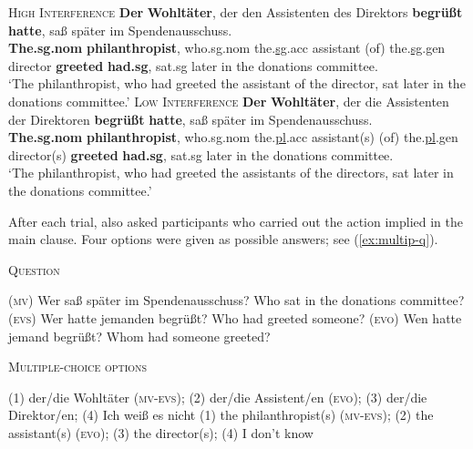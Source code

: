 \documentclass{cambridge7A}\usepackage[]{graphicx}\usepackage[]{color}
\begin{document}
\begin{exe}
    \ex  \label{ex:exp1}
    \begin{xlist}
        \ex \textsc{High Interference} \label{ex:HI}
        \gll \textbf{Der} \textbf{Wohltäter}, der den Assistenten {} des
        Direktors \textbf{begrüßt} \textbf{hatte}, saß später im
        Spendenausschuss.\\
        \textbf{The.sg.nom} \textbf{philanthropist}, who.sg.nom
        the.\underline{sg}.acc assistant (of) the.\underline{sg}.gen director
        \textbf{greeted} \textbf{had.sg}, sat.sg {later} {in the} {donations
        committee}.\\
        \glt ‘The philanthropist, who had greeted the assistant of the director,
        sat later in the donations committee.'
        \ex \textsc{Low Interference} \label{ex:LI}
        \gll \textbf{Der} \textbf{Wohltäter}, der die Assistenten {} der
        Direktoren  \textbf{begrüßt} \textbf{hatte}, saß später im
        Spendenausschuss.\\
        \textbf{The.sg.nom} \textbf{philanthropist}, who.sg.nom
        the.\underline{pl}.acc assistant(s) (of) the.\underline{pl}.gen
        director(s) \textbf{greeted} \textbf{had.sg}, sat.sg {later} {in the}
        {donations committee}.\\
        \glt ‘The philanthropist, who had greeted the assistants of the
        directors, sat later in the donations committee.'
    \end{xlist}
\end{exe}

After each trial, \cite{nicenboimexploratory} also asked participants who carried out the action implied in the main clause. Four options were given  as possible answers; see (\ref{ex:multip-q}).

\begin{exe}
    \ex  \textsc{Question} \label{ex:multip-q}
    \begin{xlist}
        \ex \textsc{(mv)} Wer saß später im Spendenausschuss? 
        \glt Who sat in the donations committee? 
        \ex \textsc{(evs)}  Wer hatte jemanden begrüßt? 
        \glt Who had greeted someone?
        \ex \textsc{(evo)}  Wen hatte jemand begrüßt? 
        \glt Whom had someone greeted?
    \end{xlist}

    \ex  \textsc{Multiple-choice options} \label{ex:answers}
    \begin{xlist}
        \ex (1) der/die Wohltäter \textsc{(mv-evs)}; (2) der/die Assistent/en \textsc{(evo)};
        (3) der/die Direktor/en; (4) Ich weiß es nicht
        \glt (1) the philanthropist(s) \textsc{(mv-evs)}; (2) the assistant(s) \textsc{(evo)}; (3)
        the director(s); (4) I don't know
    \end{xlist}
\end{exe}
\end{document}
